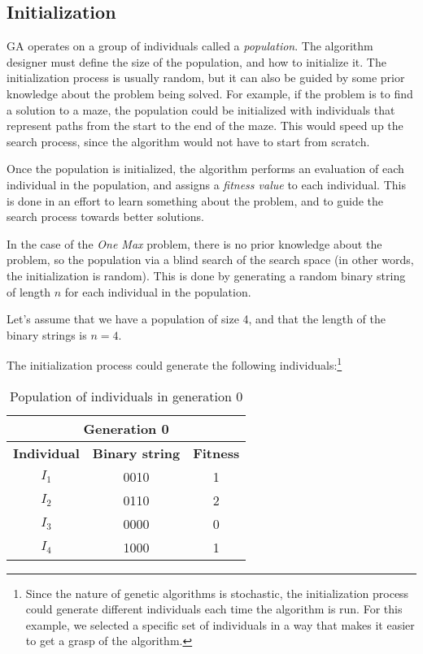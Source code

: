 \subsection{Initialization}
\label{sec:genetic_algorithms:initialization}
  GA operates on a group of individuals called a \emph{population}.
  The algorithm designer must define the size of the population, and how to initialize it.
  The initialization process is usually random, but it can also be guided by some prior knowledge
  about the problem being solved.
  For example, if the problem is to find a solution to a maze, the population could be initialized
  with individuals that represent paths from the start to the end of the maze.
  This would speed up the search process, since the algorithm would not have to start from scratch.

  Once the population is initialized, the algorithm performs an evaluation of each individual in
  the population, and assigns a \emph{fitness value} to each individual.
  This is done in an effort to learn something about the problem, and to guide the search process
  towards better solutions.

  In the case of the \emph{One Max} problem, there is no prior knowledge about the problem, so the
  population via a blind search of the search space (in other words, the initialization is random).
  This is done by generating a random binary string of length \(n\) for each individual in the
  population.

  Let's assume that we have a population of size 4, and that the length of the binary strings is
  \(n = 4\). 

  The initialization process could generate the following individuals:\footnote{
    Since the nature of genetic algorithms is stochastic, the initialization process could generate
    different individuals each time the algorithm is run.
    For this example, we selected a specific set of individuals in a way that makes it easier to
    get a grasp of the algorithm.
  }

  \begin{table}[H]
    \label{tab:genetic_algorithms:initialization:population}
    \centering
    \begin{tabular}{c|c|c}
      \multicolumn{3}{c}{\textbf{Generation 0}} \\
      \hline
      \hline
      \textbf{Individual} & \textbf{Binary string} & \textbf{Fitness} \\
      \hline
      \(I_1\) & 0010 & 1 \\
      \(I_2\) & 0110 & 2 \\
      \(I_3\) & 0000 & 0 \\
      \(I_4\) & 1000 & 1 \\
    \end{tabular}
    \caption{Population of individuals in generation 0}
  \end{table}

